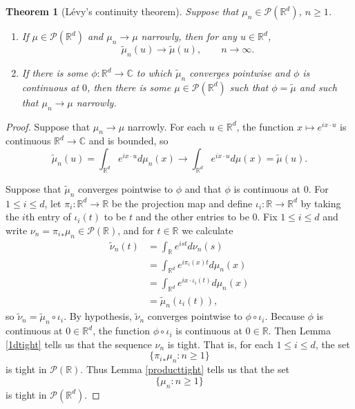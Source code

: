 \documentclass{article}
\newtheorem{theorem}{Theorem}
\theoremstyle{definition}
\begin{document}
\begin{theorem}[L\'evy's continuity theorem]
Suppose that $\mu_n \in \mathscr{P}(\mathbb{R}^d)$, $n \geq 1$. 
\begin{enumerate}
\item If $\mu \in \mathscr{P}(\mathbb{R}^d)$ and $\mu_n \to \mu$ narrowly,
then for any $u \in \mathbb{R}^d$,
\[
\tilde{\mu}_n(u) \to \tilde{\mu}(u), \qquad n \to \infty.
\]
\item If there is some $\phi:\mathbb{R}^d \to \mathbb{C}$ to which $\tilde{\mu}_n$ converges pointwise and
$\phi$ is continuous at $0$, then there is some $\mu \in \mathscr{P}(\mathbb{R}^d)$ such that
$\phi = \tilde{\mu}$ and such that $\mu_n \to \mu$ narrowly.
\end{enumerate}
\end{theorem}
\begin{proof}
Suppose that $\mu_n \to \mu$ narrowly. For each $u \in \mathbb{R}^d$, the function
$x \mapsto  e^{i x \cdot u}$ is continuous $\mathbb{R}^d \to \mathbb{C}$ and is bounded, so
\[
\tilde{\mu}_n(u) = \int_{\mathbb{R}^d} e^{ix\cdot u} d\mu_n(x) \to \int_{\mathbb{R}^d} e^{ix\cdot u} d\mu(x)
=\tilde{\mu}(u).
\]

Suppose that $\tilde{\mu}_n$ converges pointwise to $\phi$ and that $\phi$ is continuous at $0$.
For $1 \leq i \leq d$, let $\pi_i:\mathbb{R}^d \to \mathbb{R}$ be the projection map and define
$\iota_i:\mathbb{R} \to \mathbb{R}^d$  by taking
the $i$th entry of $\iota_i(t)$ to be $t$ and the other entries to be $0$.
Fix $1 \leq i \leq d$ and write $\nu_n = {\pi_i}_* \mu_n \in \mathscr{P}(\mathbb{R})$, and for $t \in \mathbb{R}$
we calculate
\begin{align*}
\tilde{\nu}_n(t)&=
\int_{\mathbb{R}} e^{ist} d\nu_n(s)\\
&=\int_{\mathbb{R}^d} e^{i\pi_i(x) t} d\mu_n(x)\\
&=\int_{\mathbb{R}^d} e^{i x\cdot \iota_i(t)} d\mu_n(x)\\
&=\tilde{\mu}_n(\iota_i(t)),
\end{align*}
so $\tilde{\nu}_n = \tilde{\mu}_n \circ \iota_i$. 
By hypothesis, $\tilde{\nu}_n$ converges pointwise to $\phi \circ \iota_i$. 
Because $\phi$ is continuous at $0 \in \mathbb{R}^d$,
the function $\phi \circ \iota_i$ is continuous at $0 \in \mathbb{R}$. 
Then Lemma \ref{1dtight} tells us that the sequence $\nu_n$ is tight.
That is, for each $1 \leq i \leq d$, the set 
\[
\{{\pi_i}_* \mu_n: n \geq 1\}
\]
is tight in $\mathscr{P}(\mathbb{R})$. Thus Lemma \ref{producttight} tells us that
the set
\[
\{\mu_n: n \geq 1\}
\]
is tight in $\mathscr{P}(\mathbb{R}^d)$. 


\end{proof}
\end{document}
